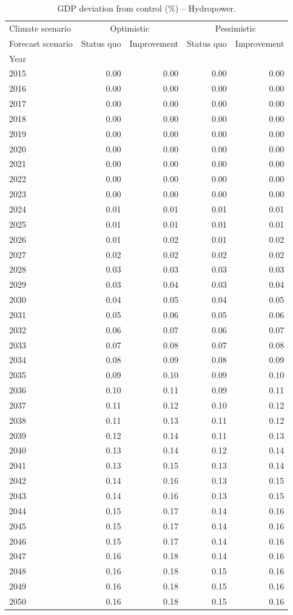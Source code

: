 \begin{table}
\caption{GDP deviation from control (\%) -- Hydropower.}
\label{tab:results_HYD_control_rel}
\centering
\begin{tabular}{lrrrr}
\toprule
Climate scenario & \multicolumn{2}{c}{Optimistic} & \multicolumn{2}{c}{Pessimistic} \\
Forecast scenario & Status quo & Improvement & Status quo & Improvement \\
Year &  &  &  &  \\
\midrule
2015 & 0.00 & 0.00 & 0.00 & 0.00 \\
2016 & 0.00 & 0.00 & 0.00 & 0.00 \\
2017 & 0.00 & 0.00 & 0.00 & 0.00 \\
2018 & 0.00 & 0.00 & 0.00 & 0.00 \\
2019 & 0.00 & 0.00 & 0.00 & 0.00 \\
2020 & 0.00 & 0.00 & 0.00 & 0.00 \\
2021 & 0.00 & 0.00 & 0.00 & 0.00 \\
2022 & 0.00 & 0.00 & 0.00 & 0.00 \\
2023 & 0.00 & 0.00 & 0.00 & 0.00 \\
2024 & 0.01 & 0.01 & 0.01 & 0.01 \\
2025 & 0.01 & 0.01 & 0.01 & 0.01 \\
2026 & 0.01 & 0.02 & 0.01 & 0.02 \\
2027 & 0.02 & 0.02 & 0.02 & 0.02 \\
2028 & 0.03 & 0.03 & 0.03 & 0.03 \\
2029 & 0.03 & 0.04 & 0.03 & 0.04 \\
2030 & 0.04 & 0.05 & 0.04 & 0.05 \\
2031 & 0.05 & 0.06 & 0.05 & 0.06 \\
2032 & 0.06 & 0.07 & 0.06 & 0.07 \\
2033 & 0.07 & 0.08 & 0.07 & 0.08 \\
2034 & 0.08 & 0.09 & 0.08 & 0.09 \\
2035 & 0.09 & 0.10 & 0.09 & 0.10 \\
2036 & 0.10 & 0.11 & 0.09 & 0.11 \\
2037 & 0.11 & 0.12 & 0.10 & 0.12 \\
2038 & 0.11 & 0.13 & 0.11 & 0.12 \\
2039 & 0.12 & 0.14 & 0.11 & 0.13 \\
2040 & 0.13 & 0.14 & 0.12 & 0.14 \\
2041 & 0.13 & 0.15 & 0.13 & 0.14 \\
2042 & 0.14 & 0.16 & 0.13 & 0.15 \\
2043 & 0.14 & 0.16 & 0.13 & 0.15 \\
2044 & 0.15 & 0.17 & 0.14 & 0.16 \\
2045 & 0.15 & 0.17 & 0.14 & 0.16 \\
2046 & 0.15 & 0.17 & 0.14 & 0.16 \\
2047 & 0.16 & 0.18 & 0.14 & 0.16 \\
2048 & 0.16 & 0.18 & 0.15 & 0.16 \\
2049 & 0.16 & 0.18 & 0.15 & 0.16 \\
2050 & 0.16 & 0.18 & 0.15 & 0.16 \\
\bottomrule
\end{tabular}
\end{table}
